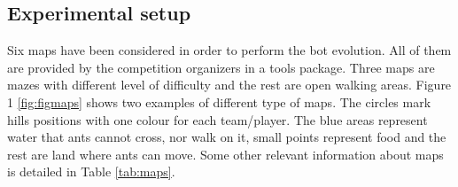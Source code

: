 \documentclass[runningheads]{llncs}
\begin{document}
 
 
 
 



\subsection{Experimental setup}
Six maps have been considered in order to perform the bot evolution. All of them are provided by the competition organizers in a tools package. Three maps are mazes with different level of difficulty and the rest are open walking areas. Figure 1 \ref{fig:figmaps} shows two examples of different type of maps. The circles mark hills positions with one colour for each team/player. The blue areas represent water that ants cannot cross, nor walk on it, small points represent food and the rest are land where ants can move. Some other relevant information about maps is detailed in Table \ref{tab:maps}. 




\end{document}
